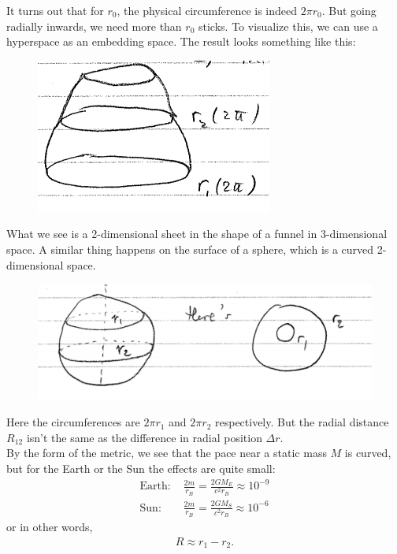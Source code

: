 \documentclass{book}
\theoremstyle{definition}
\newcommand{\f}[2]{\frac{#1}{#2}}
\begin{document}
It turns out that for $r_0$, the physical circumference is indeed $2\pi r_0$. But going radially inwards, we need more than $r_0$ sticks. To visualize this, we can use a hyperspace as an embedding space. The result looks something like this:
\begin{figure}[!htb]
	\centering
	\includegraphics[scale=0.6]{hyper}
\end{figure} 
What we see is a 2-dimensional sheet in the shape of a funnel in 3-dimensional space. A similar thing happens on the surface of a sphere, which is a curved 2-dimensional space. 
\begin{figure}[!htb]
	\centering
	\includegraphics[scale=0.4]{sphere}
\end{figure}
Here the circumferences are $2\pi r_1$ and $2\pi r_2$ respectively. But the radial distance $R_{12}$ isn't the same as the difference in radial position $\Delta r$. \\

By the form of the metric, we see that the pace near a static mass $M$ is curved, but for the Earth or the Sun the effects are quite small:
\begin{align*}
\text{Earth: } &\f{2m}{r_B} = \f{2GM_E}{c^2 r_B} \approx 10^{-9}\\
\text{Sun: } &\f{2m}{r_B} = \f{2GM_S}{c^2 r_B} \approx 10^{-6}
\end{align*}
or in other words,
\begin{align*}
R \approx r_1 - r_2.
\end{align*}
\end{document}

